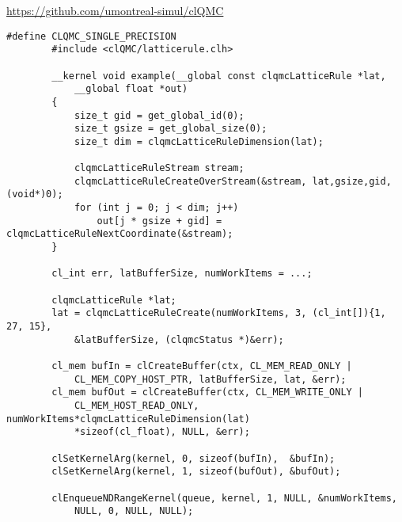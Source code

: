             \url{https://github.com/umontreal-simul/clQMC}
            \begin{lstlisting}[caption=clQMC Beispiel]    
        #define CLQMC_SINGLE_PRECISION                                 
        #include <clQMC/latticerule.clh>                               
                                                                       
        __kernel void example(__global const clqmcLatticeRule *lat, 
            __global float *out)                     
        {                                                              
            size_t gid = get_global_id(0);                                
            size_t gsize = get_global_size(0);                            
            size_t dim = clqmcLatticeRuleDimension(lat);                  
                                                                       
            clqmcLatticeRuleStream stream;                             
            clqmcLatticeRuleCreateOverStream(&stream, lat,gsize,gid, (void*)0);                 
            for (int j = 0; j < dim; j++) 
                out[j * gsize + gid] = clqmcLatticeRuleNextCoordinate(&stream); 
        }
			
        cl_int err, latBufferSize, numWorkItems = ...;
        
        clqmcLatticeRule *lat;               
        lat = clqmcLatticeRuleCreate(numWorkItems, 3, (cl_int[]){1, 27, 15}, 
            &latBufferSize, (clqmcStatus *)&err);  

        cl_mem bufIn = clCreateBuffer(ctx, CL_MEM_READ_ONLY | 
            CL_MEM_COPY_HOST_PTR, latBufferSize, lat, &err);
        cl_mem bufOut = clCreateBuffer(ctx, CL_MEM_WRITE_ONLY | 
            CL_MEM_HOST_READ_ONLY, numWorkItems*clqmcLatticeRuleDimension(lat) 
            *sizeof(cl_float), NULL, &err);
            
        clSetKernelArg(kernel, 0, sizeof(bufIn),  &bufIn);
        clSetKernelArg(kernel, 1, sizeof(bufOut), &bufOut);

        clEnqueueNDRangeKernel(queue, kernel, 1, NULL, &numWorkItems, 
            NULL, 0, NULL, NULL);
            \end{lstlisting}